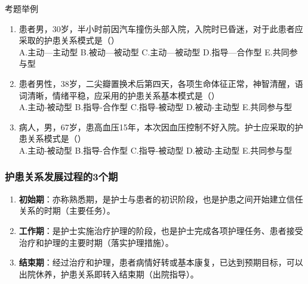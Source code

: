 \documentclass[11pt, a4paper]{ctexart}
\begin{document}
\begin{examplebox}{考题举例}
	\begin{enumerate}
		\item 患者男，30岁，半小时前因汽车撞伤头部入院，入院时已昏迷，对于此患者应采取的护患关系模式是（\qquad）\\
		      A.主动—主动型 \quad B.被动—被动型 \quad C.主动—被动型 \quad D.指导—合作型 \quad E.共同参与型
		\item 患者男性，38岁，二尖瓣置换术后第四天，各项生命体征正常，神智清醒，语词清晰，情绪平稳，应采用的护患关系基本模式是（\qquad）\\
		      A.主动-被动型 \quad B.指导-合作型 \quad C.指导-被动型 \quad D.被动-主动型 \quad E.共同参与型
		\item 病人，男，67岁，患高血压15年，本次因血压控制不好入院。护士应采取的护患关系模式是（\qquad）\\
		      A.主动-被动型 \quad B.指导-合作型 \quad C.指导-被动型 \quad D.被动-主动型 \quad E.共同参与型
	\end{enumerate}
\end{examplebox}

\subsubsection{护患关系发展过程的3个期}
\begin{enumerate}
	\item \textbf{初始期}：亦称熟悉期，是护士与患者的初识阶段，也是护患之间开始建立信任关系的时期（主要任务）。
	\item \textbf{工作期}：是护士实施治疗护理的阶段，也是护士完成各项护理任务、患者接受治疗和护理的主要时期（落实护理措施）。
	\item \textbf{结束期}：经过治疗和护理，患者病情好转或基本康复，已达到预期目标，可以出院休养，护患关系即转入结束期（出院指导）。
\end{enumerate}
\end{document}
